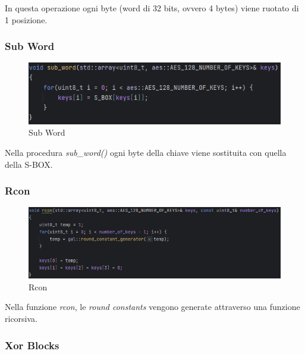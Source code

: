 \textsf{\small In questa operazione ogni byte (word di 32 bits, ovvero 4 bytes) viene ruotato di 1 posizione.} %

\subsubsection{Sub Word}

\begin{figure}[H]
	\centering
	\includegraphics[width=1\textwidth, height=1\textheight, keepaspectratio]{./images/code/cpp/key_expansion/sub_word.PNG}
	\caption{Sub Word}
	\label{fig:sub_word}
\end{figure}

\textsf{\small Nella procedura \emph{sub\_word()} ogni byte della chiave viene sostituita con quella della S-BOX.} %

\subsubsection{Rcon}

\begin{figure}[H]
	\centering
	\includegraphics[width=1\textwidth, height=1\textheight, keepaspectratio]{./images/code/cpp/key_expansion/rcon.PNG}
	\caption{Rcon}
	\label{fig:rcon}
\end{figure}

\textsf{\small Nella funzione \emph{rcon}, le \emph{round constants} vengono generate attraverso una funzione ricorsiva.} %

\subsubsection{Xor Blocks} %

